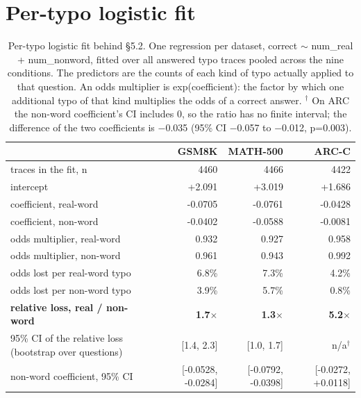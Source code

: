 \documentclass[11pt]{article}
\begin{document}
\section{Per-typo logistic fit}
\begin{table}[H]
\centering
\small
\begin{tabular}{lrrr}
\toprule
 & \textbf{GSM8K} & \textbf{MATH-500} & \textbf{ARC-C} \\
\midrule
traces in the fit, n & 4460 & 4466 & 4422 \\
intercept & +2.091 & +3.019 & +1.686 \\
coefficient, real-word & -0.0705 & -0.0761 & -0.0428 \\
coefficient, non-word & -0.0402 & -0.0588 & -0.0081 \\
odds multiplier, real-word & 0.932 & 0.927 & 0.958 \\
odds multiplier, non-word & 0.961 & 0.943 & 0.992 \\
odds lost per real-word typo & 6.8\% & 7.3\% & 4.2\% \\
odds lost per non-word typo & 3.9\% & 5.7\% & 0.8\% \\
\textbf{relative loss, real / non-word} & \textbf{1.7$\times$} & \textbf{1.3$\times$} & \textbf{5.2$\times$} \\
95\% CI of the relative loss (bootstrap over questions) & [1.4, 2.3] & [1.0, 1.7] & n/a$^\dagger$ \\
non-word coefficient, 95\% CI & [-0.0528, -0.0284] & [-0.0792, -0.0398] & [-0.0272, +0.0118] \\
\bottomrule
\end{tabular}
\caption{Per-typo logistic fit behind \S5.2. One regression per dataset, correct $\sim$ num\_real + num\_nonword, fitted over all answered typo traces pooled across the nine conditions. The predictors are the counts of each kind of typo actually applied to that question. An odds multiplier is exp(coefficient): the factor by which one additional typo of that kind multiplies the odds of a correct answer. $^\dagger$ On ARC the non-word coefficient's CI includes 0, so the ratio has no finite interval; the difference of the two coefficients is $-$0.035 (95\% CI $-$0.057 to $-$0.012, p=0.003).}
\label{tab:5}
\end{table}
\end{document}

